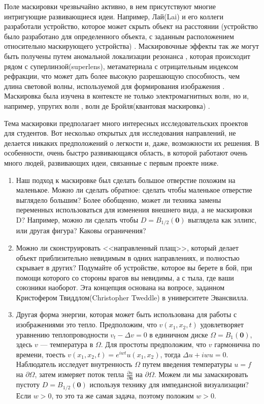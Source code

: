 \documentclass[a4paper, 12pt]{article}
\begin{document}
Поле маскировки чрезвычайно активно, в нем присутствуют многие интригующие 
развивающиеся идеи. Например, Лай(Lai) и его коллеги разработали устройство, которое
может скрыть объект на расстоянии (устройство было разработано для определенного 
объекта, с заданным расположением относительно маскирующего устройства) \cite{15}.
Маскировочные эффекты так же могут быть получены путем аномальной локализации 
резонанса \cite{21}, которая происходит рядом с суперлинзой(superlens), 
метаматериала с отрицательным индексом рефракции, что может дать более высокую
разрешающую способность, чем длина световой волны, используемой для формирования 
изображения \cite{23}. Маскировка была изучена в контексте не только электромагнитных
волн, но и, например, упругих волн \cite{20}, волн де Бройля(квантовая маскировка)
\cite{29}.

Тема маскировки предполагает много интересных исследовательских проектов для 
студентов. Вот несколько открытых для исследования направлений, не делается никаких
предположений о легкости и, даже, возможности их решения. В особенности, очень быстро
развивающаяся область, в которой работают очень много людей, развивающих идеи, 
связанные с первым проекте ниже.
\begin{enumerate}
\item Наш подход к маскировке был сделать большое отверстие похожим на маленькое.
Можно ли сделать обратное: сделать чтобы маленькое отверстие выглядело большим?
Более обобщенно, может ли техника замены переменных использоваться для изменения
внешнего вида, а не маскировки D? Например, можно ли сделать чтобы $D = 
B_{1/2}(\textbf{0})$ выглядела как эллипс, или другая фигура? Каковы ограничения?
\item Можно ли сконструировать <<направленный плащ>>, который делает объект
приблизительно невидимым в одних направлениях, и полностью скрывает в других?
Подумайте об устройстве, которое вы берете в бой, при помощи которого со стороны
врагов вы невидимы, а с тыла, где ваши союзники наоборот. Эта концепция основана на
вопросе, заданном Кристофером Твиддлом(Christopher Tweddle) в университете Эвансвилла.
\item Другая форма энергии, которая может быть использована для работы с изображениями
это тепло. Предположим, что $v(x_1, x_2, t)$ удовлетворяет уравнению теплопроводности
$v_t - \Delta v = 0$ в единичном диске $\Omega = B_1(\textbf{0})$, здесь $v$ --- 
температура в $\Omega$. Для простоты предположим, что $v$ гармонична по времени,
тоесть $v(x_1, x_2, t) = e^{iwt}u(x_1, x_2)$, тогда $\Delta u + iwu = 0$.
Наблюдатель исследует внутренность $\Omega$ путем введения температуры $u = f$ на
$\partial \Omega$, затем измеряет поток тепла $\frac{\partial u}{\partial \textbf{n}}$
на $\partial\Omega$. Можем ли мы замаскировать пустоту $D = B_{1/2}(\textbf{0})$
используя технику для импедансной визуализации? Если $w>0$, то это та же самая задача,
поэтому положим $w>0$.
\end{enumerate}
\end{document}
